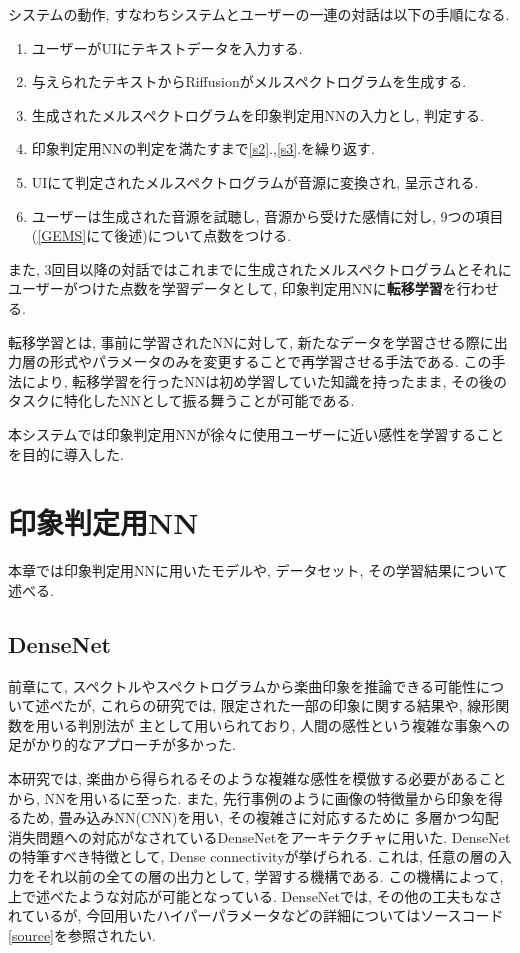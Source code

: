 \documentclass[a4paper,11pt,dvipdfmx]{jreport}
\begin{document}
\newpage
システムの動作, すなわちシステムとユーザーの一連の対話は以下の手順になる.
\begin{enumerate}
  \item ユーザーがUIにテキストデータを入力する.\label{s1}
  \item 与えられたテキストからRiffusionがメルスペクトログラムを生成する.\label{s2}
  \item 生成されたメルスペクトログラムを印象判定用NNの入力とし, 判定する.\label{s3}
  \item 印象判定用NNの判定を満たすまで\ref{s2}.,\ref{s3}.を繰り返す.
  \item UIにて判定されたメルスペクトログラムが音源に変換され, 呈示される.
  \item ユーザーは生成された音源を試聴し, 音源から受けた感情に対し, 9つの項目(\ref{GEMS}にて後述)について点数をつける.
\end{enumerate}
また, 3回目以降の対話ではこれまでに生成されたメルスペクトログラムとそれにユーザーがつけた点数を学習データとして,
印象判定用NNに\textbf{転移学習}を行わせる.

転移学習とは, 事前に学習されたNNに対して, 
新たなデータを学習させる際に出力層の形式やパラメータのみを変更することで再学習させる手法である.
この手法により, 転移学習を行ったNNは初め学習していた知識を持ったまま, 
その後のタスクに特化したNNとして振る舞うことが可能である.

本システムでは印象判定用NNが徐々に使用ユーザーに近い感性を学習することを目的に導入した.

\chapter{印象判定用NN}
本章では印象判定用NNに用いたモデルや, データセット, その学習結果について述べる.
\section{DenseNet}
前章にて, スペクトルやスペクトログラムから楽曲印象を推論できる可能性について述べたが, 
これらの研究\cite{Nagoya,Tokyo, Matsue}では, 限定された一部の印象に関する結果や, 線形関数を用いる判別法が
主として用いられており, 人間の感性という複雑な事象への足がかり的なアプローチが多かった.

本研究では, 楽曲から得られるそのような複雑な感性を模倣する必要があることから, NNを用いるに至った.
また, 先行事例のように画像の特徴量から印象を得るため, 畳み込みNN(CNN)を用い, その複雑さに対応するために
多層かつ勾配消失問題への対応がなされているDenseNet\cite{Dense}をアーキテクチャに用いた. 
DenseNetの特筆すべき特徴として, Dense connectivityが挙げられる.
これは, 任意の層の入力をそれ以前の全ての層の出力として, 学習する機構である.
この機構によって, 上で述べたような対応が可能となっている.
DenseNetでは, その他の工夫もなされているが, 今回用いたハイパーパラメータなどの詳細についてはソースコード\ref{source}を参照されたい.
\end{document}
